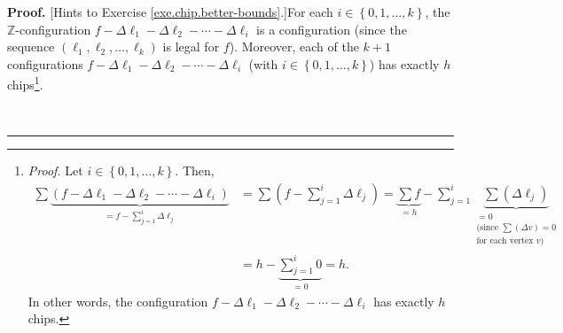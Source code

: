 \documentclass[numbers=enddot,12pt,final,onecolumn,notitlepage]{scrartcl}%
\theoremstyle{definition}
\newenvironment{proof}[1][Proof]{\noindent\textbf{#1.} }{\ \rule{0.5em}{0.5em}}
\let\sumnonlimits\sum
\renewcommand{\sum}{\sumnonlimits\limits}
\begin{document}
\begin{proof}
[Hints to Exercise \ref{exe.chip.better-bounds}.]For each $i\in\left\{
0,1,\ldots,k\right\}  $, the $\mathbb{Z}$-configuration $f-\Delta\ell
_{1}-\Delta\ell_{2}-\cdots-\Delta\ell_{i}$ is a configuration (since the
sequence $\left(  \ell_{1},\ell_{2},\ldots,\ell_{k}\right)  $ is legal for
$f$). Moreover, each of the $k+1$ configurations $f-\Delta\ell_{1}-\Delta
\ell_{2}-\cdots-\Delta\ell_{i}$ (with $i\in\left\{  0,1,\ldots,k\right\}  $)
has exactly $h$ chips\footnote{\textit{Proof.} Let $i\in\left\{
0,1,\ldots,k\right\}  $. Then,%
\begin{align*}
\sum\underbrace{\left(  f-\Delta\ell_{1}-\Delta\ell_{2}-\cdots-\Delta\ell
_{i}\right)  }_{=f-\sum_{j=1}^{i}\Delta\ell_{j}}  &  =\sum\left(  f-\sum
_{j=1}^{i}\Delta\ell_{j}\right)  =\underbrace{\sum f}_{=h}-\sum_{j=1}%
^{i}\underbrace{\sum\left(  \Delta\ell_{j}\right)  }%
_{\substack{=0\\\text{(since }\sum\left(  \Delta v\right)  =0\\\text{for each
vertex }v\text{)}}}\\
&  =h-\underbrace{\sum_{j=1}^{i}0}_{=0}=h.
\end{align*}
In other words, the configuration $f-\Delta\ell_{1}-\Delta\ell_{2}%
-\cdots-\Delta\ell_{i}$ has exactly $h$ chips.}.


\end{proof}
\end{document}

